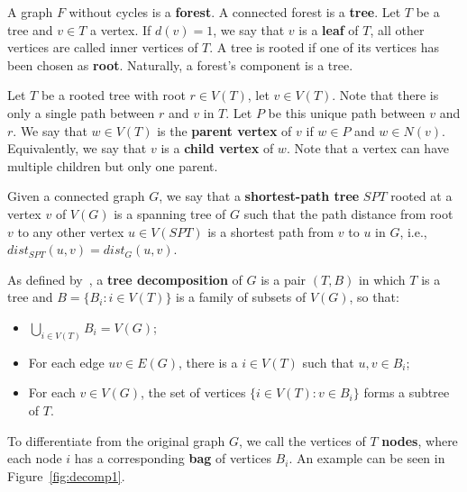 
A graph \(F\) without cycles is a \textbf{forest}. A connected forest is a \textbf{tree}. Let \(T\) be a tree and \(v \in T\) a vertex. If \(d(v) = 1\), we say that \(v\) is a \textbf{leaf} of \(T\), all other vertices are called inner vertices of \(T\). A tree is rooted if one of its vertices has been chosen as \textbf{root}. Naturally, a forest's component is a tree. 

Let \(T\) be a rooted tree with root \(r \in V(T)\), let \(v \in V(T)\). Note that there is only a single path between \(r\) and \(v\) in \(T\). Let \(P\) be this unique path between \(v\) and \(r\). We say that \(w \in V(T)\) is the \textbf{parent vertex} of \(v\) if \(w \in P\) and \(w \in N(v)\). Equivalently, we say that \(v\) is a \textbf{child vertex} of \(w\). Note that a vertex can have multiple children but only one parent.

Given a connected graph \(G\), we say that a \textbf{shortest-path tree} \(SPT\) rooted at a vertex \(v\) of \(V(G)\) is a spanning tree of \(G\) such that the path distance from root \(v\) to any other vertex \(u \in V(SPT)\) is a shortest path from \(v\) to \(u\) in \(G\), i.e., \(dist_{SPT}(u, v) = dist_{G}(u, v)\).

As defined by~\cite{ROBERTSON1986309}, a \textbf{tree decomposition} of \(G\) is a pair \((T, B)\) in which \(T\) is a tree and \(B = \{B_i \colon i \in V(T)\}\) is a family of subsets of \(V(G)\), so that:

\begin{itemize}
    \item \(\bigcup_{i \in V(T)} B_i = V(G)\);
    \item For each edge \(uv \in E(G)\), there is a \(i \in V(T)\) such that \(u, v \in B_i\);
    \item For each \(v \in V(G)\), the set of vertices \(\{i \in V(T) \colon v \in B_i\}\) forms a subtree of \(T\).
\end{itemize}

To differentiate from the original graph \(G\), we call the vertices of \(T\) \textbf{nodes}, where each node \(i\) has a corresponding \textbf{bag} of vertices \(B_i\). An example can be seen in Figure~\ref{fig:decomp1}.

